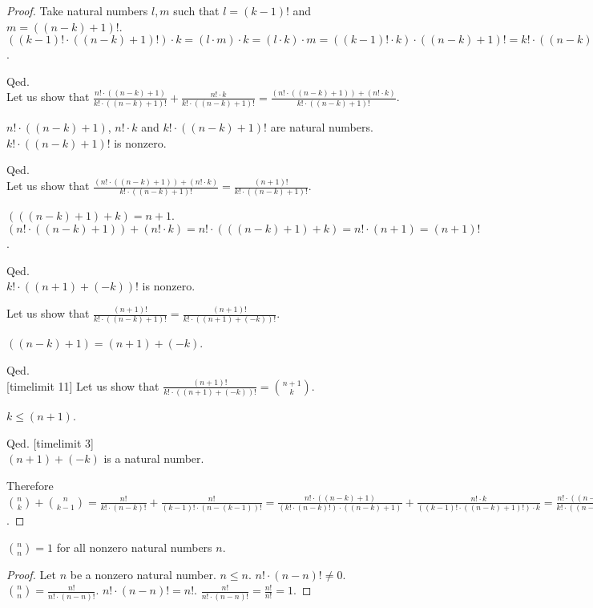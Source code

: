 \documentclass{article}
\begin{document}
\begin{forthel}
\begin{proof}
Take natural numbers $l,m$ such that $l = (k-1)!$ and $m = ((n-k)+1)!$.
$((k-1)! \cdot ((n-k)+1)!) \cdot k = 
(l \cdot m) \cdot k =
(l \cdot k) \cdot m =
((k-1)! \cdot k) \cdot ((n-k)+1)! = k! \cdot ((n-k)+1)!$.

Qed.
\\
  
Let us show that 
$\frac{n! \cdot ((n-k)+1)}{k! \cdot ((n-k)+1)! } + 
\frac{n! \cdot k}{k! \cdot ((n-k)+1)!} = 
\frac{(n! \cdot ((n-k)+1)) + (n! \cdot k)}{k! \cdot ((n-k)+1)!}$.

$n! \cdot ((n-k)+1)$, $n! \cdot k$ and $k! \cdot ((n-k)+1)!$ are natural numbers.
$k! \cdot ((n-k)+1)!$ is nonzero.

Qed.
\\

Let us show that
$ \frac{(n! \cdot ((n-k)+1)) + (n! \cdot k)}{k! \cdot ((n-k)+1)!}
= \frac{(n+1)!}{k! \cdot ((n-k)+1)!}$.

$(((n-k)+1)+k) = n+1$.
$(n! \cdot ((n-k)+1)) + (n! \cdot k) = n! \cdot (((n-k)+1)+k) =  n! \cdot (n+1) = (n+1)!$.

Qed.
\\

$k! \cdot ((n+1)+(-k))!$ is nonzero.

Let us show that $ \frac{(n+1)!}{k! \cdot ((n-k)+1)!}
= \frac{(n+1)!}{k! \cdot ((n+1)+(-k))!}$.

$((n-k)+1)=(n+1)+(-k)$.

Qed.
\\

[timelimit 11]
Let us show that $\frac{(n+1)!}{k! \cdot ((n+1)+(-k))!} = \binom{n+1}{k}$.

$k \leq (n+1)$.

Qed.
[timelimit 3]\\

$(n+1)+(-k)$ is a natural number.

Therefore 
$\binom{n}{k} + \binom{n}{k-1}
= \frac{n!}{k! \cdot (n-k)!} + \frac{n!}{(k-1)! \cdot (n-(k-1))!}
= \frac{n! \cdot ((n-k)+1)}{(k! \cdot (n-k)!) \cdot ((n-k)+1) } + 
\frac{n! \cdot k}{((k-1)! \cdot ((n-k)+1)!) \cdot k}
= \frac{n! \cdot ((n-k)+1)}{k! \cdot ((n-k)+1)! } + 
\frac{n! \cdot k}{k! \cdot ((n-k)+1)!}
= \frac{(n! \cdot ((n-k)+1)) + (n! \cdot k)}{k! \cdot ((n-k)+1)!}
= \frac{(n+1)!}{k! \cdot ((n-k)+1)!}
= \frac{(n+1)!}{k! \cdot ((n+1)+(-k))!}
= \binom{n+1}{k}$.
\end{proof}

\begin{lemma}
$\binom{n}{n} = 1$ for all nonzero natural numbers $n$.
\end{lemma}
\begin{proof}
Let $n$ be a nonzero natural number.
$n \leq n.$
$n! \cdot (n-n)! \neq 0$.
$\binom{n}{n} = \frac{n!}{n! \cdot (n-n)!}$.
$n! \cdot (n-n)! = n!$.
$\frac{n!}{n! \cdot (n-n)!} = \frac{n!}{n!} = 1$.
\end{proof}



\end{forthel}
\end{document}
